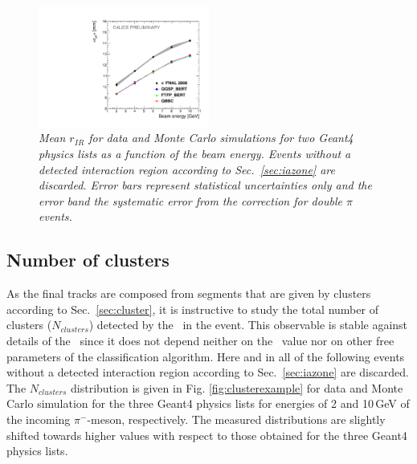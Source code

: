 \begin{figure}
	\centering
	\includegraphics[width=0.5\textwidth]{ECAL/plots/r-ir-graph.pdf}
	\caption{\label{fig:irrgraph} \sl Mean $r_{IR}$ for data and Monte Carlo simulations for two {\sc Geant}4 physics lists as a function of the beam energy. Events without a detected interaction region according to Sec.~\ref{sec:iazone} are discarded. Error bars represent statistical uncertainties only and the error band the systematic error from the correction for double $\pi$ events.}
\end{figure}

\subsection{Number of clusters}
As the final tracks are composed from segments that are given by clusters according to Sec.~\ref{sec:cluster}, it is instructive to study the total number of clusters ($N_{clusters}$) detected by the \tfa\ in the event. This observable is stable against details of the \tfa\,
since it does not depend neither on the \ep\ value nor on other free parameters of the classification algorithm. Here and in all of the following events without a detected interaction region according to Sec.~\ref{sec:iazone} are discarded.
The $N_{clusters}$ distribution is given in Fig. \ref{fig:clusterexample} for data and Monte Carlo simulation for the three {\sc Geant4} physics lists for energies of 2 and 10\,GeV of the incoming $\pi^-$-meson, respectively. The measured distributions are slightly shifted towards higher values with respect to those obtained for the three {\sc Geant4} physics lists.

